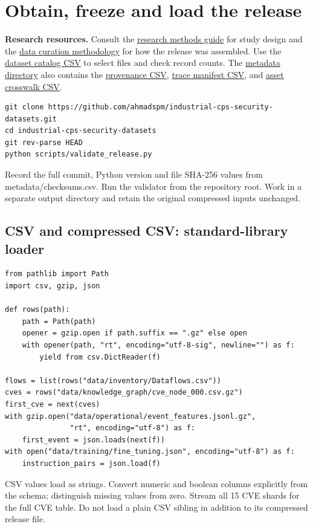 \clearpage\section{Obtain, freeze and load the release}
\noindent\textbf{Research resources.} Consult the
\href{https://github.com/ahmadspm/industrial-cps-security-datasets/blob/main/docs/RESEARCH_METHODS.md}{research methods guide}
for study design and the
\href{https://github.com/ahmadspm/industrial-cps-security-datasets/blob/main/docs/METHODS.md}{data curation methodology}
for how the release was assembled. Use the
\href{https://github.com/ahmadspm/industrial-cps-security-datasets/blob/main/metadata/dataset_catalog.csv}{dataset catalog CSV}
to select files and check record counts. The
\href{https://github.com/ahmadspm/industrial-cps-security-datasets/tree/main/metadata}{metadata directory}
also contains the
\href{https://github.com/ahmadspm/industrial-cps-security-datasets/blob/main/metadata/provenance.csv}{provenance CSV},
\href{https://github.com/ahmadspm/industrial-cps-security-datasets/blob/main/metadata/trace_manifest.csv}{trace manifest CSV},
and \href{https://github.com/ahmadspm/industrial-cps-security-datasets/blob/main/metadata/asset_graph_crosswalk.csv}{asset crosswalk CSV}.

\begin{Verbatim}[fontsize=\footnotesize,breaklines=true,frame=single,rulecolor=\color{rulegray},framesep=8pt]
git clone https://github.com/ahmadspm/industrial-cps-security-datasets.git
cd industrial-cps-security-datasets
git rev-parse HEAD
python scripts/validate_release.py
\end{Verbatim}
Record the full commit, Python version and file SHA-256 values from metadata/checksums.csv. Run the validator from the repository root. Work in a separate output directory and retain the original compressed inputs unchanged.

\subsection*{CSV and compressed CSV: standard-library loader}
\begin{Verbatim}[fontsize=\footnotesize,breaklines=true,frame=single,rulecolor=\color{rulegray},framesep=8pt]
from pathlib import Path
import csv, gzip, json

def rows(path):
    path = Path(path)
    opener = gzip.open if path.suffix == ".gz" else open
    with opener(path, "rt", encoding="utf-8-sig", newline="") as f:
        yield from csv.DictReader(f)

flows = list(rows("data/inventory/Dataflows.csv"))
cves = rows("data/knowledge_graph/cve_node_000.csv.gz")
first_cve = next(cves)
with gzip.open("data/operational/event_features.jsonl.gz",
               "rt", encoding="utf-8") as f:
    first_event = json.loads(next(f))
with open("data/training/fine_tuning.json", encoding="utf-8") as f:
    instruction_pairs = json.load(f)
\end{Verbatim}
CSV values load as strings. Convert numeric and boolean columns explicitly from the schema; distinguish missing values from zero. Stream all 15 CVE shards for the full CVE table. Do not load a plain CSV sibling in addition to its compressed release file.

